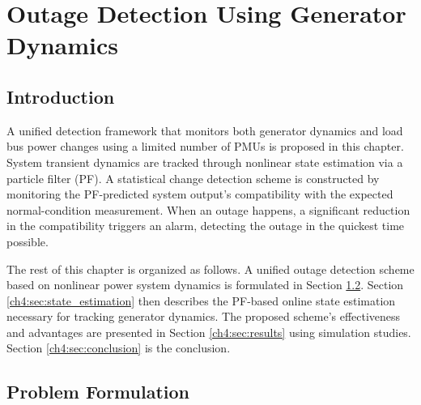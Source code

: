 

\chapter{Outage Detection Using Generator Dynamics} %
\label{ch:detection_using_generator_dynamics}


\section{Introduction} %
\label{ch4:sec:introduction}

A unified detection framework that monitors both generator dynamics and load bus power changes using a limited number of PMUs is proposed in this chapter. System transient dynamics are tracked through nonlinear state estimation via a particle filter (PF). A statistical change detection scheme is constructed by monitoring the PF-predicted system output's compatibility with the expected normal-condition measurement. When an outage happens, a significant reduction in the compatibility triggers an alarm, detecting the outage in the quickest time possible. 

The rest of this chapter is organized as follows. A unified outage detection scheme based on nonlinear power system dynamics is formulated in Section \ref{ch4:sec:formulation}. Section \ref{ch4:sec:state_estimation} then describes the PF-based online state estimation necessary for tracking generator dynamics. The proposed scheme's effectiveness and advantages are presented in Section \ref{ch4:sec:results} using simulation studies. Section \ref{ch4:sec:conclusion} is the conclusion.


\section{Problem Formulation}
\label{ch4:sec:formulation}
